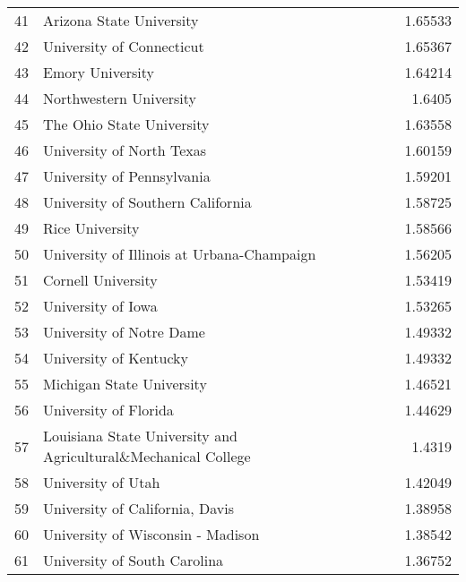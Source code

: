 \begin{tabular}{rlr}
  41 & Arizona State University                                       &  1.65533  \\
  42 & University of Connecticut                                      &  1.65367  \\
  43 & Emory University                                               &  1.64214  \\
  44 & Northwestern University                                        &  1.6405   \\
  45 & The Ohio State University                                      &  1.63558  \\
  46 & University of North Texas                                      &  1.60159  \\
  47 & University of Pennsylvania                                     &  1.59201  \\
  48 & University of Southern California                              &  1.58725  \\
  49 & Rice University                                                &  1.58566  \\
  50 & University of Illinois at Urbana-Champaign                     &  1.56205  \\
  51 & Cornell University                                             &  1.53419  \\
  52 & University of Iowa                                             &  1.53265  \\
  53 & University of Notre Dame                                       &  1.49332  \\
  54 & University of Kentucky                                         &  1.49332  \\
  55 & Michigan State University                                      &  1.46521  \\
  56 & University of Florida                                          &  1.44629  \\
  57 & Louisiana State University and Agricultural\&Mechanical College &  1.4319   \\
  58 & University of Utah                                             &  1.42049  \\
  59 & University of California, Davis                                &  1.38958  \\
  60 & University of Wisconsin - Madison                              &  1.38542  \\
  61 & University of South Carolina                                   &  1.36752  \\

\end{tabular}
